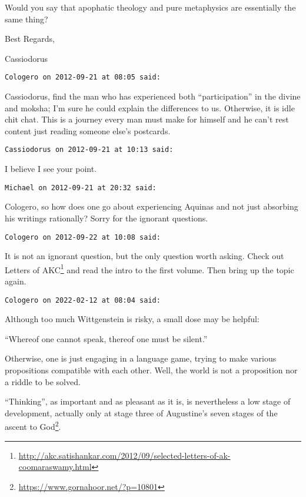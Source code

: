 \begin{footnotesize}
\begin{sffamily}
Would you say that apophatic theology and pure metaphysics are essentially the same thing?

Best Regards,

Cassiodorus


\hfill

\texttt{Cologero on 2012-09-21 at 08:05 said: }

Cassiodorus, find the man who has experienced both “participation” in the divine and moksha; I'm sure he could explain the differences to us. Otherwise, it is idle chit chat. This is a journey every man must make for himself and he can't rest content just reading someone else's postcards.


\hfill

\texttt{Cassiodorus on 2012-09-21 at 10:13 said: }

I believe I see your point.


\hfill

\texttt{Michael on 2012-09-21 at 20:32 said: }

Cologero, so how does one go about experiencing Aquinas and not just absorbing his writings rationally? Sorry for the ignorant questions.


\hfill

\texttt{Cologero on 2012-09-22 at 10:08 said: }

It is not an ignorant question, but the only question worth asking. Check out Letters of AKC\footnote{\url{http://akc.satishankar.com/2012/09/selected-letters-of-ak-coomaraswamy.html}} and read the intro to the first volume. Then bring up the topic again.


\hfill

\texttt{Cologero on 2022-02-12 at 08:04 said: }

Although too much Wittgenstein is risky, a small dose may be helpful:

“Whereof one cannot speak, thereof one must be silent.”

Otherwise, one is just engaging in a language game, trying to make various propositions compatible with each other. Well, the world is not a proposition nor a riddle to be solved.

“Thinking”, as important and as pleasant as it is, is nevertheless a low stage of development, actually only at stage three of Augustine's seven stages of the ascent to God\footnote{\url{https://www.gornahoor.net/?p=10801}}.


\end{sffamily}\end{footnotesize}
